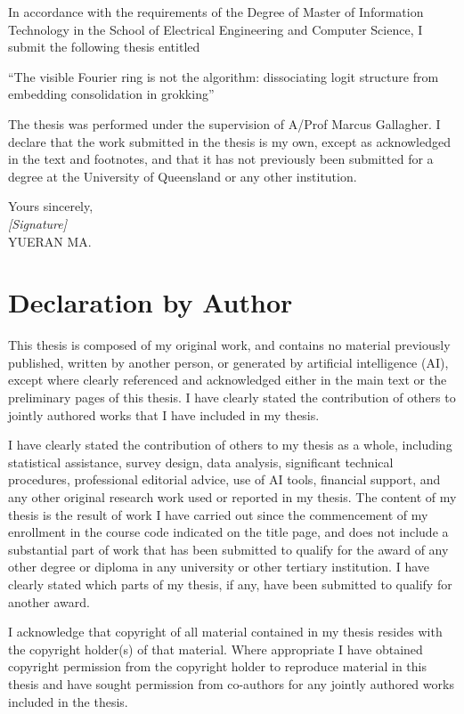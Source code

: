 \documentclass[12pt,openany,a4paper]{book}
\begin{document}
In accordance with the requirements of the Degree of Master of Information Technology in the School of Electrical Engineering and Computer Science, I submit the following thesis entitled
\begin{center}
``The visible Fourier ring is not the algorithm: dissociating logit structure from embedding consolidation in grokking''
\end{center}
The thesis was performed under the supervision of A/Prof Marcus Gallagher. I declare that the work submitted in the thesis is my own, except as acknowledged in the text and footnotes, and that it has not previously been submitted for a degree at the University of Queensland or any other institution.

\begin{flushright}
	Yours sincerely,\\
	\medskip
	\emph{[Signature]}\\
	\medskip
	YUERAN MA.
\end{flushright}

\chapter{Declaration by Author}

This thesis is composed of my original work, and contains no material previously published, written by another person, or generated by artificial intelligence (AI), except where clearly referenced and acknowledged either in the main text or the preliminary pages of this thesis. I have clearly stated the contribution of others to jointly authored works that I have included in my thesis.

I have clearly stated the contribution of others to my thesis as a whole, including statistical assistance, survey design, data analysis, significant technical procedures, professional editorial advice, use of AI tools, financial support, and any other original research work used or reported in my thesis. The content of my thesis is the result of work I have carried out since the commencement of my enrollment in the course code indicated on the title page, and does not include a substantial part of work that has been submitted to qualify for the award of any other degree or diploma in any university or other tertiary institution. I have clearly stated which parts of my thesis, if any, have been submitted to qualify for another award.

I acknowledge that copyright of all material contained in my thesis resides with the copyright holder(s) of that material. Where appropriate I have obtained copyright permission from the copyright holder to reproduce material in this thesis and have sought permission from co-authors for any jointly authored works included in the thesis.
\end{document}
